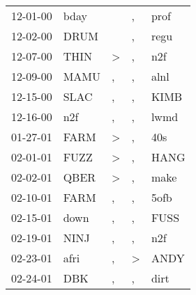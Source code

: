 \begin{supertabular}{p{0.07\textwidth}p{0.06\textwidth}p{0.02\textwidth}p{0.02\textwidth}p{0.06\textwidth}}
          12-01-00\textsuperscript{} &           bday\textsuperscript{} &                  &                , &           prof\textsuperscript{} \\
          12-02-00\textsuperscript{} &           DRUM\textsuperscript{} &                  &                , &           regu\textsuperscript{} \\
          12-07-00\textsuperscript{} &           THIN\textsuperscript{} &     \textgreater &                , &            n2f\textsuperscript{} \\
          12-09-00\textsuperscript{} &           MAMU\textsuperscript{} &                , &                , &           alnl\textsuperscript{} \\
          12-15-00\textsuperscript{} &           SLAC\textsuperscript{} &                , &                , &           KIMB\textsuperscript{} \\
          12-16-00\textsuperscript{} &            n2f\textsuperscript{} &                , &                , &           lwmd\textsuperscript{} \\
          01-27-01\textsuperscript{} &           FARM\textsuperscript{} &     \textgreater &                , &            40s\textsuperscript{} \\
          02-01-01\textsuperscript{} &           FUZZ\textsuperscript{} &     \textgreater &                , &           HANG\textsuperscript{} \\
          02-02-01\textsuperscript{} &           QBER\textsuperscript{} &     \textgreater &                , &           make\textsuperscript{} \\
          02-10-01\textsuperscript{} &           FARM\textsuperscript{} &                , &                , &           5ofb\textsuperscript{} \\
          02-15-01\textsuperscript{} &           down\textsuperscript{} &                , &                , &           FUSS\textsuperscript{} \\
          02-19-01\textsuperscript{} &           NINJ\textsuperscript{} &                , &                , &            n2f\textsuperscript{} \\
          02-23-01\textsuperscript{} &           afri\textsuperscript{} &                , &     \textgreater &           ANDY\textsuperscript{} \\
          02-24-01\textsuperscript{} &            DBK\textsuperscript{} &                , &                , &           dirt\textsuperscript{} \\

\end{supertabular}
